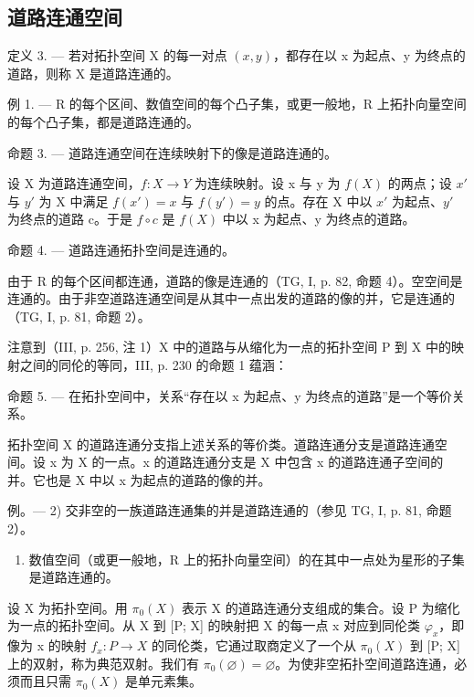 \subsection{道路连通空间}

定义 3. --- 若对拓扑空间 X 的每一对点 \((x,y)\)，都存在以 x 为起点、y 为终点的道路，则称 X 是道路连通的。

例 1. --- R 的每个区间、数值空间的每个凸子集，或更一般地，R 上拓扑向量空间的每个凸子集，都是道路连通的。

命题 3. --- 道路连通空间在连续映射下的像是道路连通的。

设 X 为道路连通空间，\(f: X \to Y\) 为连续映射。设 x 与 y 为 \(f(X)\) 的两点；设 \(x'\) 与 \(y'\) 为 X 中满足 \(f(x') = x\) 与 \(f(y') = y\) 的点。存在 X 中以 \(x'\) 为起点、\(y'\) 为终点的道路 c。于是 \(f \circ c\) 是 \(f(X)\) 中以 x 为起点、y 为终点的道路。

命题 4. --- 道路连通拓扑空间是连通的。

由于 R 的每个区间都连通，道路的像是连通的（TG, I, p. 82, 命题 4）。空空间是连通的。由于非空道路连通空间是从其中一点出发的道路的像的并，它是连通的（TG, I, p. 81, 命题 2）。

注意到（III, p. 256, 注 1）X 中的道路与从缩化为一点的拓扑空间 P 到 X 中的映射之间的同伦的等同，III, p. 230 的命题 1 蕴涵：

命题 5. --- 在拓扑空间中，关系“存在以 x 为起点、y 为终点的道路”是一个等价关系。

拓扑空间 X 的道路连通分支指上述关系的等价类。道路连通分支是道路连通空间。设 x 为 X 的一点。x 的道路连通分支是 X 中包含 x 的道路连通子空间的并。它也是 X 中以 x 为起点的道路的像的并。

例。--- 2) 交非空的一族道路连通集的并是道路连通的（参见 TG, I, p. 81, 命题 2）。

\begin{enumerate}
\def\labelenumi{\arabic{enumi})}
\setcounter{enumi}{2}
\tightlist
\item
  数值空间（或更一般地，R 上的拓扑向量空间）的在其中一点处为星形的子集是道路连通的。
\end{enumerate}

设 X 为拓扑空间。用 \(\pi_{0}(X)\) 表示 X 的道路连通分支组成的集合。设 P 为缩化为一点的拓扑空间。从 X 到 {[}P; X{]} 的映射把 X 的每一点 x 对应到同伦类 \(\varphi_{x}\)，即像为 x 的映射 \(f_{x}: P \to X\) 的同伦类，它通过取商定义了一个从 \(\pi_{0}(X)\) 到 {[}P; X{]} 上的双射，称为典范双射。我们有 \(\pi_{0}(\varnothing) = \varnothing\)。为使非空拓扑空间道路连通，必须而且只需 \(\pi_{0}(X)\) 是单元素集。


